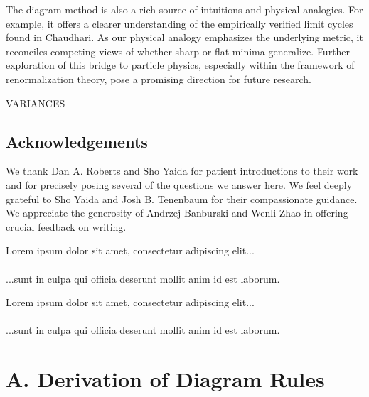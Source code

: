 \documentclass{article}
\newcommand{\lorem}[1]{
    Lorem ipsum dolor sit amet, consectetur adipiscing elit...\\
    \nopagebreak\vspace{#1cm} \ \\
    ...sunt in culpa qui officia deserunt mollit anim id est laborum.
}
\begin{document}
    The diagram method is also a rich source of intuitions and physical
    analogies.  For example, it offers a clearer understanding of the
    empirically verified limit cycles found in Chaudhari.  As our physical
    analogy emphasizes the underlying metric, it reconciles competing views
    of whether sharp or flat minima generalize.  Further exploration of this
    bridge to particle physics, especially within the framework of
    renormalization theory, pose a promising direction for future research.

    VARIANCES


\subsection{Acknowledgements}
    We thank Dan A. Roberts and Sho Yaida for patient introductions to their
    work and for precisely posing several of the questions we answer here.  We
    feel deeply grateful to Sho Yaida and Josh B. Tenenbaum for their
    compassionate guidance.  We appreciate the generosity of
        Andrzej Banburski
        and
        Wenli Zhao
    in offering crucial feedback on writing.


    
    

    \lorem{3}
    \lorem{3}


\section*{A. Derivation of Diagram Rules}
\end{document}
